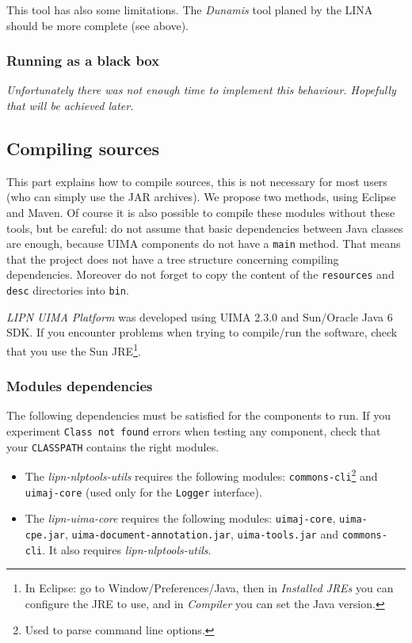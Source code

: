 \documentclass{article}
\newcommand{\softName}{{\em LIPN UIMA Platform}\xspace}
\newenvironment{xitemize}{
\begin{itemize}
  \setlength{\itemsep}{.3\baselineskip}
  \setlength{\topsep}{0pt}
  \setlength{\parskip}{0pt}
  \setlength{\parsep}{0pt}
}{\end{itemize}}
\newcommand{\uimaModule}{{\em lipn-uima-core}\xspace}
\newcommand{\utilsModule}{{\em lipn-nlptools-utils}\xspace}
\begin{document}
This tool has also some limitations. The {\em Dunamis} tool planed by the LINA should be more complete (see above).


\subsubsection{Running as a black box}
\label{partRunNoUima}

{\em Unfortunately there was not enough time to implement this behaviour. Hopefully that will be achieved later.}



\subsection{Compiling sources}
\label{partCompile}

This part explains how to compile sources, this is not necessary for most users (who can simply use the JAR archives). 
 We propose two methods, using Eclipse and Maven. Of course it is also possible to compile these modules without these tools, but be careful: do not assume that basic dependencies between Java classes are enough, because UIMA components do not have a {\tt main} method. That means that the project does not have a tree structure concerning compiling dependencies. Moreover do not forget to copy the content of the {\tt resources} and {\tt desc} directories into {\tt bin}.

\softName was developed using UIMA 2.3.0 and Sun/Oracle Java 6 SDK. If you encounter problems when trying to compile/run the software, check that you use the Sun JRE\footnote{In Eclipse: go to Window/Preferences/Java, then in {\em Installed JREs} you can configure the JRE to use, and in {\em Compiler} you can set the Java version.}.


\subsubsection{Modules dependencies}
\label{partDependencies}

The following dependencies must be satisfied for the components to run. If you experiment {\tt Class not found} errors when testing any component, check that your {\tt CLASSPATH} contains the right modules.
\begin{xitemize}
\item The \utilsModule requires the following modules: {\tt commons-cli}\footnote{Used to parse command line options.} and {\tt uimaj-core} (used only for the {\tt Logger} interface).
\item The \uimaModule requires the following modules:  {\tt uimaj-core}, {\tt uima-cpe.jar}, {\tt uima-document-annotation.jar}, {\tt uima-tools.jar} and {\tt commons-cli}. It also requires \utilsModule.
\end{xitemize}
\end{document}
